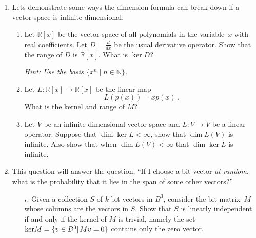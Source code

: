 \begin{enumerate}

\item %
Lets demonstrate some ways the dimension formula can break down if a vector space is infinite dimensional.
\begin{enumerate}
\item Let $\mathbb{R}[x]$ be the vector space of all polynomials  in the variable~$x$ with real coefficients. Let $D = \frac{d}{dx}$ be the usual derivative operator. Show that the range of $D$ is $\mathbb{R}[x]$. What is $\ker D$?

\emph{Hint: Use the basis $\{ x^n \mid n \in \mathbb{N} \}$.}

\item Let $L \colon \mathbb{R}[x] \rightarrow \mathbb{R}[x]$ be the linear map $$L(p(x)) = xp(x)\, .$$  What is the kernel and range of $M$?



\item Let $V$ be an infinite dimensional vector space and $L \colon V \rightarrow V$ be a linear operator. Suppose that $\dim \ker L < \infty$, show that $\dim L(V)$ is infinite. Also show that when $\dim L(V) < \infty$ that $\dim \ker L$ is infinite.
\end{enumerate}

\item This question will answer the question, ``If I choose a bit vector \emph{at random}, what is the probability that it lies in the span of some other vectors?''

\begin{itemize}
\item[$i.$] Given a collection $S$ of $k$ bit vectors in $B^3$, consider the bit matrix~$M$ whose columns are the vectors in $S$.  Show that $S$ is linearly independent if and only if the kernel of $M$ is trivial, namely the set ${\rm ker}M=\{v\in B^3| \, Mv=0\}$ contains only the zero vector.


\end{itemize}
\end{enumerate}
